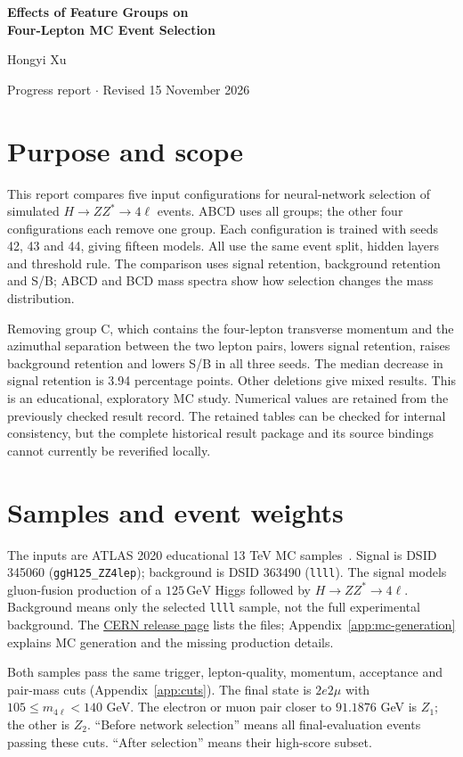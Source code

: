 \documentclass[11pt,a4paper]{article}
\newcommand{\gev}{\,\mathrm{GeV}}
\begin{document}
{\LARGE\bfseries\color{reportblue} Effects of Feature Groups on\\ Four-Lepton MC Event Selection\par}
\vspace{6pt}
Hongyi Xu\par
Progress report $\cdot$ Revised 15 November 2026

\section{Purpose and scope}
This report compares five input configurations for neural-network selection of simulated $H\to ZZ^*\to4\ell$ events.
ABCD uses all groups; the other four configurations each remove one group.
Each configuration is trained with seeds 42, 43 and 44, giving fifteen models. All use the same event split, hidden layers and threshold rule.
The comparison uses signal retention, background retention and S/B; ABCD and BCD mass spectra show how selection changes the mass distribution.

Removing group C, which contains the four-lepton transverse momentum and the azimuthal separation between the two lepton pairs, lowers signal retention, raises background retention and lowers S/B in all three seeds.
The median decrease in signal retention is 3.94 percentage points. Other deletions give mixed results.
This is an educational, exploratory MC study.
Numerical values are retained from the previously checked result record. The retained tables can be checked for internal consistency, but the complete historical result package and its source bindings cannot currently be reverified locally.

\section{Samples and event weights}
The inputs are ATLAS 2020 educational 13 TeV MC samples~\cite{OpenData}.
Signal is DSID 345060 (\texttt{ggH125\_ZZ4lep}); background is DSID 363490 (\texttt{llll}).
The signal models gluon-fusion production of a $125\gev$ Higgs followed by $H\to ZZ^*\to4\ell$.
Background means only the selected \texttt{llll} sample, not the full experimental background.
The \href{https://opendata.cern.ch/record/15005}{CERN release page} lists the files; Appendix~\ref{app:mc-generation} explains MC generation and the missing production details.

Both samples pass the same trigger, lepton-quality, momentum, acceptance and pair-mass cuts (Appendix~\ref{app:cuts}).
The final state is $2e2\mu$ with $105\leq m_{4\ell}<140$ GeV. The electron or muon pair closer to $91.1876$ GeV is $Z_1$; the other is $Z_2$.
``Before network selection'' means all final-evaluation events passing these cuts. ``After selection'' means their high-score subset.
\end{document}
